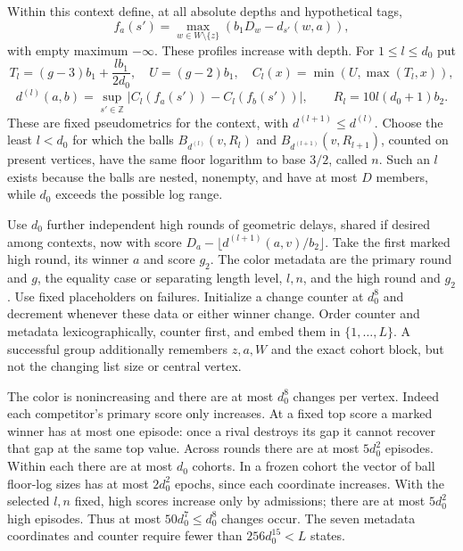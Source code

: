 \documentclass[11pt]{article}
\theoremstyle{definition}
\newcommand{\Z}{\mathbb Z}
\numberwithin{equation}{section}
\begin{document}
Within this context define, at all absolute depths and hypothetical tags,
\[
 f_a(s')=\max_{w\in W\setminus\{z\}}(b_1D_w-d_{s'}(w,a)),
\]
with empty maximum $-\infty$. These profiles increase with depth. For $1\le l\le d_0$ put
\[
 T_l=(g-3)b_1+\frac{lb_1}{2d_0},\quad U=(g-2)b_1,\quad
 C_l(x)=\min(U,\max(T_l,x)),
\]
\[
 d^{(l)}(a,b)=\sup_{s'\in\Z}|C_l(f_a(s'))-C_l(f_b(s'))|,
 \qquad R_l=10l(d_0+1)b_2.
\]
These are fixed pseudometrics for the context, with $d^{(l+1)}\le d^{(l)}$. Choose the least $l<d_0$ for which the balls $B_{d^{(l)}}(v,R_l)$ and $B_{d^{(l+1)}}(v,R_{l+1})$, counted on present vertices, have the same floor logarithm to base $3/2$, called $n$. Such an $l$ exists because the balls are nested, nonempty, and have at most $D$ members, while $d_0$ exceeds the possible log range.

Use $d_0$ further independent high rounds of geometric delays, shared if desired among contexts, now with score $D_a-\lfloor d^{(l+1)}(a,v)/b_2\rfloor$. Take the first marked high round, its winner $a$ and score $g_2$. The color metadata are the primary round and $g$, the equality case or separating length level, $l,n$, and the high round and $g_2$. Use fixed placeholders on failures. Initialize a change counter at $d_0^8$ and decrement whenever these data or either winner change. Order counter and metadata lexicographically, counter first, and embed them in $\{1,\ldots,L\}$. A successful group additionally remembers $z,a,W$ and the exact cohort block, but not the changing list size or central vertex.

The color is nonincreasing and there are at most $d_0^8$ changes per vertex. Indeed each competitor's primary score only increases. At a fixed top score a marked winner has at most one episode: once a rival destroys its gap it cannot recover that gap at the same top value. Across rounds there are at most $5d_0^2$ episodes. Within each there are at most $d_0$ cohorts. In a frozen cohort the vector of ball floor-log sizes has at most $2d_0^2$ epochs, since each coordinate increases. With the selected $l,n$ fixed, high scores increase only by admissions; there are at most $5d_0^2$ high episodes. Thus at most $50d_0^7\le d_0^8$ changes occur. The seven metadata coordinates and counter require fewer than $256d_0^{15}<L$ states.
\end{document}
